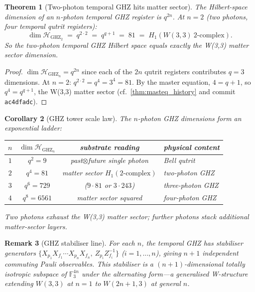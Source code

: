 ﻿\documentclass[12pt]{article}
\newtheorem{theorem}{Theorem}[section]
\newtheorem{corollary}[theorem]{Corollary}
\newtheorem{remark}[theorem]{Remark}
\newcommand{\GF}[1]{\mathbb{F}_{#1}}
\begin{document}
\begin{theorem}[Two-photon temporal GHZ hits matter sector]\label{thm:two_photon_matter}
The Hilbert-space dimension of an $n$-photon temporal GHZ register is
$q^{2n}$.  At $n = 2$ (two photons, four temporal qutrit registers):
\begin{equation}
  \dim \mathcal H_{\mathrm{GHZ}_2} \;=\; q^{2 \cdot 2}
  \;=\; q^{q+1} \;=\; 81 \;=\; H_1(W(3,3)\ 2\text{-complex}).
\end{equation}
So the two-photon temporal GHZ Hilbert space equals exactly the W(3,3)
matter sector dimension.
\end{theorem}

\begin{proof}
$\dim \mathcal H_{\mathrm{GHZ}_n} = q^{2n}$ since each of the $2n$ qutrit
registers contributes $q = 3$ dimensions.  At $n = 2$:
$q^{2 \cdot 2} = q^4 = 3^4 = 81$.  By the master equation, $4 = q + 1$, so
$q^4 = q^{q+1}$, the W(3,3) matter sector (cf.~\cref{thm:masteq_history}
and commit \texttt{ac4dfadc}).
\end{proof}

\begin{corollary}[GHZ tower scale law]\label{cor:ghz_scale}
The $n$-photon GHZ dimensions form an exponential ladder:
\begin{center}\begin{tabular}{cccl}
$n$ & $\dim\mathcal H_{\mathrm{GHZ}_n}$ & substrate reading & physical content \\
\hline
$1$ & $q^2 = 9$  & past$\otimes$future single photon & Bell qutrit \\
$2$ & $q^4 = 81$ & matter sector $H_1(2\text{-complex})$ & two-photon GHZ \\
$3$ & $q^6 = 729$ & ($9\cdot 81$ or $3\cdot 243$)  & three-photon GHZ \\
$4$ & $q^8 = 6561$ & matter sector squared & four-photon GHZ \\
\end{tabular}\end{center}
Two photons exhaust the W(3,3) matter sector; further photons stack additional
matter-sector layers.
\end{corollary}

\begin{remark}[GHZ stabiliser line]
For each $n$, the temporal GHZ has stabiliser generators
$\{X_{p_1}X_{f_1}\cdots X_{p_n}X_{f_n},\ Z_{p_i}Z_{f_i}^{-1}\}$ ($i =
1,\ldots,n$), giving $n+1$ independent commuting Pauli observables.
This stabiliser is a $(n+1)$-dimensional totally isotropic subspace of
$\GF{3}^{4n}$ under the alternating form---a generalised W-structure
extending $W(3,3)$ at $n = 1$ to $W(2n+1,3)$ at general $n$.
\end{remark}
\end{document}
